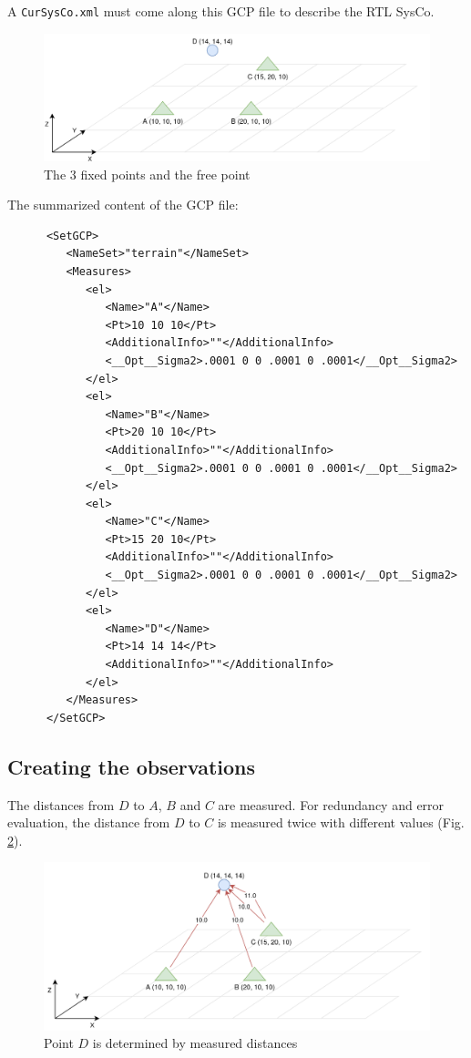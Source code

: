 A {\tt CurSysCo.xml} must come along this GCP file to describe the RTL SysCo.


\begin{figure}[!h]
\centering
\includegraphics[width=12cm]{Programmer/benchtopo1b.png}
\caption{The 3 fixed points and the free point}
\label{fig:topoEx1}
\end{figure}

The summarized content of the GCP file:

\begin{lstlisting}
      <SetGCP>
         <NameSet>"terrain"</NameSet>
         <Measures>
            <el>
               <Name>"A"</Name>
               <Pt>10 10 10</Pt>
               <AdditionalInfo>""</AdditionalInfo>
               <__Opt__Sigma2>.0001 0 0 .0001 0 .0001</__Opt__Sigma2>
            </el>
            <el>
               <Name>"B"</Name>
               <Pt>20 10 10</Pt>
               <AdditionalInfo>""</AdditionalInfo>
               <__Opt__Sigma2>.0001 0 0 .0001 0 .0001</__Opt__Sigma2>
            </el>
            <el>
               <Name>"C"</Name>
               <Pt>15 20 10</Pt>
               <AdditionalInfo>""</AdditionalInfo>
               <__Opt__Sigma2>.0001 0 0 .0001 0 .0001</__Opt__Sigma2>
            </el>
            <el>
               <Name>"D"</Name>
               <Pt>14 14 14</Pt>
               <AdditionalInfo>""</AdditionalInfo>
            </el>
         </Measures>
      </SetGCP>
\end{lstlisting}


\subsection{Creating the observations}

The distances from $D$ to $A$, $B$ and $C$
are measured. For redundancy and error evaluation, the distance from $D$ to $C$ is measured twice
with different values (Fig. \ref{fig:topoEx2}).

\begin{figure}[!h]
\centering
\includegraphics[width=12cm]{Programmer/benchtopo2.png}
\caption{Point $D$ is determined by measured distances}
\label{fig:topoEx2}
\end{figure}

